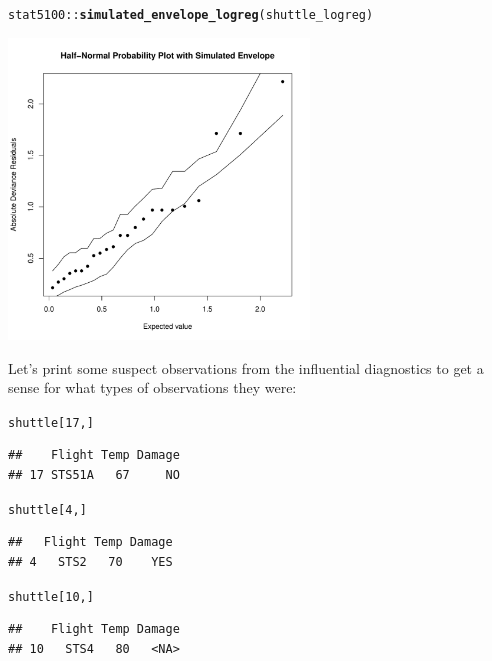 \documentclass{article}\usepackage[]{graphicx}\usepackage[]{color}
\makeatletter
\newcommand{\hlnum}[1]{\textcolor[rgb]{0.686,0.059,0.569}{#1}}%
\newcommand{\hlopt}[1]{\textcolor[rgb]{0,0,0}{#1}}%
\newcommand{\hlstd}[1]{\textcolor[rgb]{0.345,0.345,0.345}{#1}}%
\newcommand{\hlkwd}[1]{\textcolor[rgb]{0.737,0.353,0.396}{\textbf{#1}}}%
\newenvironment{kframe}{%
 \def\at@end@of@kframe{}%
 \ifinner\ifhmode%
  \def\at@end@of@kframe{\end{minipage}}%
  \begin{minipage}{\columnwidth}%
 \fi\fi%
 \def\FrameCommand##1{\hskip\@totalleftmargin \hskip-\fboxsep
 \colorbox{shadecolor}{##1}\hskip-\fboxsep
     \hskip-\linewidth \hskip-\@totalleftmargin \hskip\columnwidth}%
 \MakeFramed {\advance\hsize-\width
   \@totalleftmargin\z@ \linewidth\hsize
   \@setminipage}}%
 {\par\unskip\endMakeFramed%
 \at@end@of@kframe}
\newenvironment{knitrout}{}{} %
\makeatother
\begin{document}
\begin{knitrout}
\color{fgcolor}\begin{kframe}
\begin{alltt}
\hlstd{stat5100}\hlopt{::}\hlkwd{simulated_envelope_logreg}\hlstd{(shuttle_logreg)}
\end{alltt}


{\ttfamily\noindent\color{warningcolor}{\#\# Warning: glm.fit: algorithm did not converge}}

{\ttfamily\noindent\color{warningcolor}{\#\# Warning: glm.fit: fitted probabilities numerically 0 or 1 occurred}}\end{kframe}

{\centering \includegraphics[width=0.6\textwidth]{figure/unnamed-chunk-6-1} 

}



\end{knitrout}

Let's print some suspect observations from the influential diagnostics to get a sense for what types of observations they were:

\begin{knitrout}
\color{fgcolor}\begin{kframe}
\begin{alltt}
\hlstd{shuttle[}\hlnum{17}\hlstd{, ]}
\end{alltt}
\begin{verbatim}
##    Flight Temp Damage
## 17 STS51A   67     NO
\end{verbatim}
\begin{alltt}
\hlstd{shuttle[}\hlnum{4}\hlstd{, ]}
\end{alltt}
\begin{verbatim}
##   Flight Temp Damage
## 4   STS2   70    YES
\end{verbatim}
\begin{alltt}
\hlstd{shuttle[}\hlnum{10}\hlstd{, ]}
\end{alltt}
\begin{verbatim}
##    Flight Temp Damage
## 10   STS4   80   <NA>
\end{verbatim}
\end{kframe}
\end{knitrout}
\end{document}
